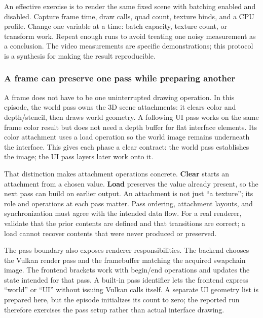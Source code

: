 An effective exercise is to render the same fixed scene with batching enabled and disabled. Capture frame time, draw calls, quad count, texture binds, and a CPU profile. Change one variable at a time: batch capacity, texture count, or transform work. Repeat enough runs to avoid treating one noisy measurement as a conclusion. The video measurements are specific demonstrations; this protocol is a synthesis for making the result reproducible.

\subsubsection{A frame can preserve one pass while preparing another}\label{06-engine-ii-ch026-a-frame-can-preserve-one-pass-while-preparing-another}

\hypertarget{06-engine-ii-ch026-a-frame-can-preserve-one-pass-while-preparing-another}{}

A frame does not have to be one uninterrupted drawing operation. In this episode, the world pass owns the 3D scene attachments: it clears color and depth/stencil, then draws world geometry. A following UI pass works on the same frame color result but does not need a depth buffer for flat interface elements. Its color attachment uses a load operation so the world image remains underneath the interface. This gives each phase a clear contract: the world pass establishes the image; the UI pass layers later work onto it.

That distinction makes attachment operations concrete. \textbf{Clear} starts an attachment from a chosen value. \textbf{Load} preserves the value already present, so the next pass can build on earlier output. An attachment is not just ``a texture''; its role and operations at each pass matter. Pass ordering, attachment layouts, and synchronization must agree with the intended data flow. For a real renderer, validate that the prior contents are defined and that transitions are correct; a load cannot recover contents that were never produced or preserved.

The pass boundary also exposes renderer responsibilities. The backend chooses the Vulkan render pass and the framebuffer matching the acquired swapchain image. The frontend brackets work with begin/end operations and updates the state intended for that pass. A built-in pass identifier lets the frontend express ``world'' or ``UI'' without issuing Vulkan calls itself. A separate UI geometry list is prepared here, but the episode initializes its count to zero; the reported run therefore exercises the pass setup rather than actual interface drawing.

